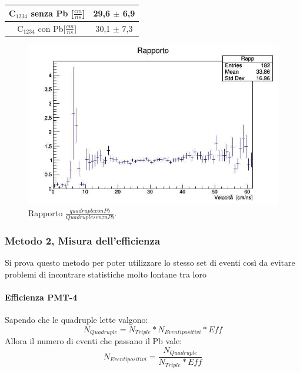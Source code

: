\documentclass[a4paper]{article}
\begin{document}
\begin{tabular}{c|c}
C$_{1234}$ senza Pb [$\frac{cm}{ns}$] & 29,6 $\pm$ 6,9 \\
\hline
C$_{1234}$ con Pb[$\frac{cm}{ns}$] & 30,1 $\pm$ 7,3
\label{tab:FitVMet1}
\end{tabular}

\begin{figure}[H]
\centering
\includegraphics[scale=0.3]{./immagini/TimeOfFlight/VRappFore.jpg}
\caption{Rapporto $\frac{quadruple con Pb}{Quadruple senza Pb}$.}
\label{fig:VRappFore}
\end{figure}

\subsubsection*{Metodo 2, Misura dell'efficienza}
\label{sec:Met2}
Si prova questo metodo per poter utilizzare lo stesso set di eventi così da evitare problemi di incontrare statistiche molto lontane tra loro

\paragraph{Efficienza PMT-4}
Sapendo che le quadruple lette valgono:
\begin{equation}
N_{Quadruple} = N_{Triple} * N_{Eventi positivi} * Eff
\end{equation}
Allora il numero di eventi che passano il Pb vale:
\begin{equation}
N_{Eventi positivi} = \frac{N_{Quadruple}}{N_{Triple}*Eff}
\label{eq:VRappMet2}
\end{equation}
\end{document}
